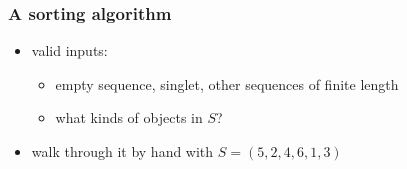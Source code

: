 %
%
%
%


\begin{frame}[fragile]
%
  \frametitle{A sorting algorithm}
%
    \begin{center}
      \begin{minipage}{.75\linewidth}
        \begin{algorithm}[H]
          \label{alg:insertion-sort}
%
          \dontprintsemicolon
          \setalcaphskip{0ex}
%
          \caption{\insertionsort($S$)}
          \vspace{.5em}
%
%
          \vspace{.5em}
%
        \end{algorithm}
      \end{minipage}
    \end{center}
%
  \begin{itemize}
%
  \item valid inputs:
    \begin{itemize}
    \item empty sequence, singlet, other sequences of finite length
    \item what kinds of objects in $S$?
    \end{itemize}
%
  \item walk through it by hand with $S = (5, 2, 4, 6, 1, 3)$
%
  \end{itemize}
%
\end{frame}

